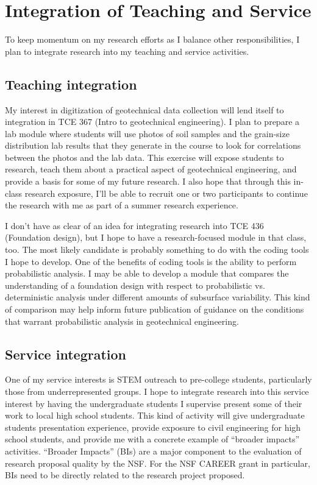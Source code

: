 \documentclass[10pt,letterpaper]{article}
\begin{document}
\section{Integration of Teaching and Service}
To keep momentum on my research efforts as I balance other responsibilities, I plan to integrate research into my teaching and service activities.
\subsection*{Teaching integration}
My interest in digitization of geotechnical data collection will lend itself to integration in TCE 367 (Intro to geotechnical engineering).
I plan to prepare a lab module where students will use photos of soil samples and the grain-size distribution lab results that they generate in the course to look for correlations between the photos and the lab data.
This exercise will expose students to research, teach them about a practical aspect of geotechnical engineering, and provide a basis for some of my future research.
I also hope that through this in-class research exposure, I'll be able to recruit one or two participants to continue the research with me as part of a summer research experience.

I don't have as clear of an idea for integrating research into TCE 436 (Foundation design), but I hope to have a research-focused module in that class, too.
The most likely candidate is probably something to do with the coding tools I hope to develop.
One of the benefits of coding tools is the ability to perform probabilistic analysis.
I may be able to develop a module that compares the understanding of a foundation design with respect to probabilistic vs. deterministic analysis under different amounts of subsurface variability.
This kind of comparison may help inform future publication of guidance on the conditions that warrant probabilistic analysis in geotechnical engineering.

\subsection*{Service integration}
One of my service interests is STEM outreach to pre-college students, particularly those from underrepresented groups.
I hope to integrate research into this service interest by having the undergraduate students I supervise present some of their work to local high school students.
This kind of activity will give undergraduate students presentation experience, provide exposure to civil engineering for high school students, and provide me with a concrete example of ``broader impacts'' activities.
``Broader Impacts'' (BIs) are a major component to the evaluation of research proposal quality by the NSF.
For the NSF CAREER grant in particular, BIs need to be directly related to the research project proposed.
\end{document}
